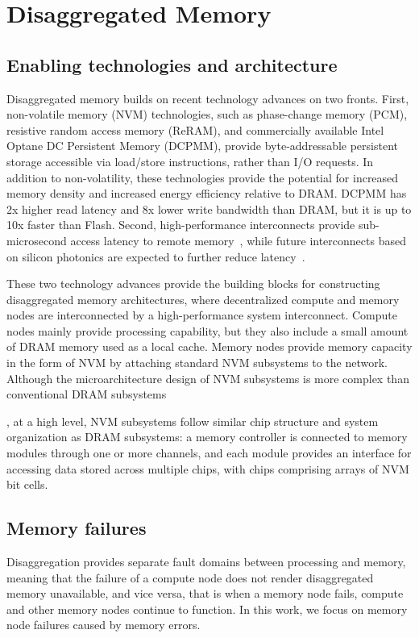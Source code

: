 \section{Disaggregated Memory}\label{sec:background}

\subsection{Enabling technologies and architecture}
Disaggregated memory builds on recent technology advances on two fronts.
First, non-volatile memory (NVM) technologies, such as phase-change memory (PCM), resistive random access memory (ReRAM), and commercially available Intel Optane DC Persistent Memory (DCPMM), provide byte-addressable persistent storage accessible via load/store instructions, rather than I/O requests. In addition to non-volatility, these technologies provide the potential for increased memory density and increased energy efficiency relative to DRAM. DCPMM has 2x higher read latency and 8x lower write bandwidth than DRAM, but it is up to 10x faster than Flash. %
Second, high-performance interconnects provide sub-microsecond access latency to remote memory~\cite{knebel:genz:hotchips:2019,pinto:thymesis:micro:2020}, while future interconnects based on silicon photonics are expected to further reduce latency~\cite{knebel:genz:hotchips:2019}.

These two technology advances provide the building blocks for constructing disaggregated memory architectures, where decentralized compute and memory nodes are interconnected by a high-performance system interconnect. 
Compute nodes mainly provide processing capability, but they also include a small amount of DRAM memory used as a local cache.
Memory nodes provide memory capacity in the form of NVM by attaching standard NVM subsystems to the network. 
Although the microarchitecture design of NVM subsystems is more complex than conventional DRAM subsystems, at a high level, NVM subsystems follow similar chip structure and system organization as DRAM subsystems: 
a memory controller is connected to memory modules through one or more channels, and each module provides an interface for accessing data stored across multiple chips, with chips comprising arrays of NVM bit cells. 

\subsection{Memory failures}
\label{sec:failure-model}
Disaggregation provides separate fault domains between processing and memory, meaning that the failure of a compute node does not render disaggregated memory unavailable, and vice versa, that is when a memory node fails, compute and other memory nodes continue to function. 
In this work, we focus on memory node failures caused by memory errors.

